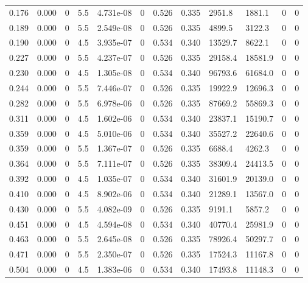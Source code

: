 \documentclass[preview]{standalone}
\begin{document}
{{\begin{tabular}{L{1.2cm}C{1.2cm} C{0.3cm}C{0.5cm} C{1.4cm}C{1.4cm} C{1.4cm}C{1.4cm} C{1.6cm}C{1.6cm} C{1.6cm}C{1.6cm}}
  0.176  &  0.000  & 0     & 5.5 &  4.731e-08  & 0  &  0.526&   0.335& 2951.8 & 1881.1   &  0 & 0  \\ 
  0.189  &  0.000  & 0     & 5.5 &  2.549e-08  & 0  &  0.526&   0.335& 4899.5 & 3122.3   &  0 & 0  \\ 
  0.190  &  0.000  & 0     & 4.5 &  3.935e-07  & 0  &  0.534&   0.340& 13529.7 & 8622.1   &  0 & 0  \\ 
  0.227  &  0.000  & 0     & 5.5 &  4.237e-07  & 0  &  0.526&   0.335& 29158.4 & 18581.9   &  0 & 0  \\ 
  0.230  &  0.000  & 0     & 4.5 &  1.305e-08  & 0  &  0.534&   0.340& 96793.6 & 61684.0   &  0 & 0  \\ 
  0.244  &  0.000  & 0     & 5.5 &  7.446e-07  & 0  &  0.526&   0.335& 19922.9 & 12696.3   &  0 & 0  \\ 
  0.282  &  0.000  & 0     & 5.5 &  6.978e-06  & 0  &  0.526&   0.335& 87669.2 & 55869.3   &  0 & 0  \\ 
  0.311  &  0.000  & 0     & 4.5 &  1.602e-06  & 0  &  0.534&   0.340& 23837.1 & 15190.7   &  0 & 0  \\ 
  0.359  &  0.000  & 0     & 4.5 &  5.010e-06  & 0  &  0.534&   0.340& 35527.2 & 22640.6   &  0 & 0  \\ 
  0.359  &  0.000  & 0     & 5.5 &  1.367e-07  & 0  &  0.526&   0.335& 6688.4 & 4262.3   &  0 & 0  \\ 
  0.364  &  0.000  & 0     & 5.5 &  7.111e-07  & 0  &  0.526&   0.335& 38309.4 & 24413.5   &  0 & 0  \\ 
  0.392  &  0.000  & 0     & 4.5 &  1.035e-07  & 0  &  0.534&   0.340& 31601.9 & 20139.0   &  0 & 0  \\ 
  0.410  &  0.000  & 0     & 4.5 &  8.902e-06  & 0  &  0.534&   0.340& 21289.1 & 13567.0   &  0 & 0  \\ 
  0.430  &  0.000  & 0     & 5.5 &  4.082e-09  & 0  &  0.526&   0.335& 9191.1 & 5857.2   &  0 & 0  \\ 
  0.451  &  0.000  & 0     & 4.5 &  4.594e-08  & 0  &  0.534&   0.340& 40770.4 & 25981.9   &  0 & 0  \\ 
  0.463  &  0.000  & 0     & 5.5 &  2.645e-08  & 0  &  0.526&   0.335& 78926.4 & 50297.7   &  0 & 0  \\ 
  0.471  &  0.000  & 0     & 5.5 &  2.350e-07  & 0  &  0.526&   0.335& 17524.3 & 11167.8   &  0 & 0  \\ 
  0.504  &  0.000  & 0     & 4.5 &  1.383e-06  & 0  &  0.534&   0.340& 17493.8 & 11148.3   &  0 & 0  \\ 

\end{tabular}}}
\end{document}
